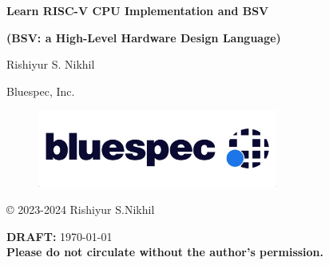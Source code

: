 
\pagestyle{empty}

\begin{center}

\vspace*{1.5in}

{\LARGE\bf Learn RISC-V CPU Implementation and BSV}

{\Large\bf (BSV: a High-Level Hardware Design Language)}

\vspace{2cm}

{\Large Rishiyur S. Nikhil}

Bluespec, Inc.

\vspace*{0.5in}

\begin{figure}[htbp]
  \centerline{\includegraphics[height=1in,angle=0]{Figures/Bluespec_Logo_2022-10}}
\end{figure}

\vfill

\copyright{} 2023-2024 Rishiyur S.Nikhil

\vspace{0.5in}

{\bf DRAFT:} \today \\
{\bf Please do not circulate without the author's permission.}

\end{center}






\vspace*{2in}


% 


\newpage

